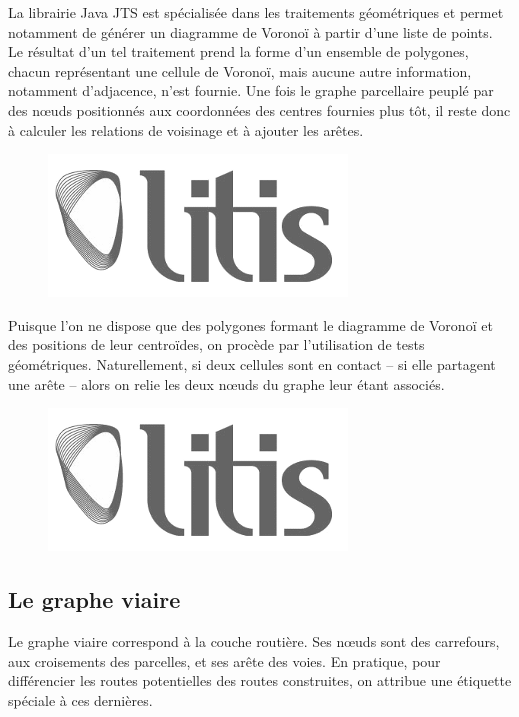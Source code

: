 \documentclass[12pt]{article}
\begin{document}
La librairie Java JTS \cite{JTS} est spécialisée dans les traitements
géométriques et permet notamment de générer un diagramme de Voronoï à
partir d'une liste de points. Le résultat d'un tel traitement prend la
forme d'un ensemble de polygones, chacun représentant une cellule de
Voronoï, mais aucune autre information, notamment d'adjacence, n'est
fournie. Une fois le graphe parcellaire peuplé par des n\oe uds
positionnés aux coordonnées des centres fournies plus tôt, il reste
donc à calculer les relations de voisinage et à ajouter les arêtes.

\begin{figure}
  \centering
  \includegraphics[width=.6\linewidth]{images/logo-litis.png}
  \caption{}
  \label{fig:construction-bati2}
\end{figure}

Puisque l'on ne dispose que des polygones formant le diagramme de
Voronoï et des positions de leur centroïdes, on procède par
l'utilisation de tests géométriques. Naturellement, si deux cellules
sont en contact -- si elle partagent une arête -- alors on relie les
deux n\oe uds du graphe leur étant associés.

\begin{figure}
  \centering
  \includegraphics[width=.6\linewidth]{images/logo-litis.png}
  \caption{}
  \label{fig:construction-bati3}
\end{figure}

\subsection{Le graphe viaire}

Le graphe viaire correspond à la couche routière. Ses n\oe uds sont
des carrefours, aux croisements des parcelles, et ses arête des
voies. En pratique, pour différencier les routes potentielles des
routes construites, on attribue une étiquette spéciale à ces
dernières.
\end{document}
